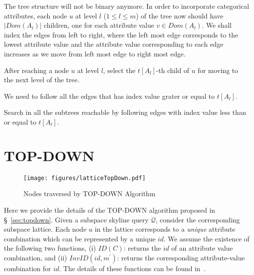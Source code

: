  The tree structure will not be binary anymore. In order to incorporate categorical attributes, each node $u$ at level $l$ ($1 \leq l \leq m$) of the tree now should have $|Dom(A_l)|$ children, one for each attribute value $v \in Dom(A_l)$. We shall index the edges from left to right, where the left most edge corresponds to the lowest attribute value and the attribute value corresponding to each edge increases as we move from left most edge to right most edge.

\vspace{1mm}
 After reaching a node $u$ at level $l$, select the $t[A_l]$-th child of $u$ for moving to the next level of the tree.

 We need to follow all the edges that has index value grater or equal to $t[A_l]$.

 Search in all the subtrees reachable by following edges with index value less than or equal to $t[A_l]$.

%

\section{TOP-DOWN}\label{ap:top-down}

\begin{figure}[!h]
  \centering
  \texttt{[image: figures/latticeTopDown.pdf]}
  \caption{Nodes traversed by TOP-DOWN Algorithm}
  \label{fig:latticeTopDown}
\end{figure}

Here we provide the details of the TOP-DOWN algorithm proposed in \S~\ref{sec:topdown}.
Given a subspace skyline query $\mathcal{Q}$, consider the corresponding subspace lattice. Each node $u$ in the lattice corresponds to a {\em unique} attribute combination which can be represented by a unique $id$. We assume the existence of the following two functions, (i) $ID(C)$: returns the $id$ of an attribute value combination, and (ii) $InvID(id, m^\prime)$: returns the corresponding attribute-value combination for $id$. The details of these functions can be found in~\cite{preisinger2007hexagon}.

